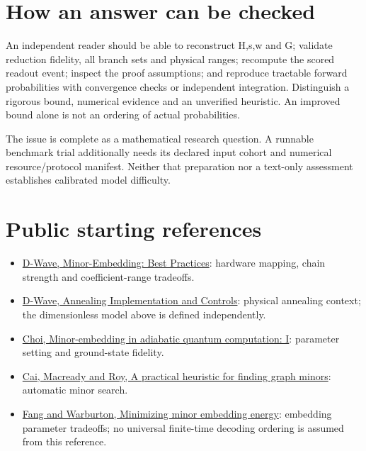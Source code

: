 \documentclass[11pt,letterpaper]{article}
\begin{document}
\section{How an answer can be checked}
An independent reader should be able to reconstruct H,s,w and G; validate reduction fidelity, all branch sets and physical ranges; recompute the scored readout event; inspect the proof assumptions; and reproduce tractable forward probabilities with convergence checks or independent integration. Distinguish a rigorous bound, numerical evidence and an unverified heuristic. An improved bound alone is not an ordering of actual probabilities.\par
The issue is complete as a mathematical research question. A runnable benchmark trial additionally needs its declared input cohort and numerical resource/protocol manifest. Neither that preparation nor a text-only assessment establishes calibrated model difficulty.\par
\section{Public starting references}
\begin{itemize}
\item \href{https://docs.dwavequantum.com/en/latest/quantum_research/embedding_guidance.html}{D-Wave, Minor-Embedding: Best Practices}: hardware mapping, chain strength and coefficient-range tradeoffs.
\item \href{https://docs.dwavequantum.com/en/latest/quantum_research/annealing.html}{D-Wave, Annealing Implementation and Controls}: physical annealing context; the dimensionless model above is defined independently.
\item \href{https://arxiv.org/abs/0804.4884}{Choi, Minor-embedding in adiabatic quantum computation: I}: parameter setting and ground-state fidelity.
\item \href{https://arxiv.org/abs/1406.2741}{Cai, Macready and Roy, A practical heuristic for finding graph minors}: automatic minor search.
\item \href{https://arxiv.org/abs/1905.03291}{Fang and Warburton, Minimizing minor embedding energy}: embedding parameter tradeoffs; no universal finite-time decoding ordering is assumed from this reference.
\end{itemize}
\end{document}
